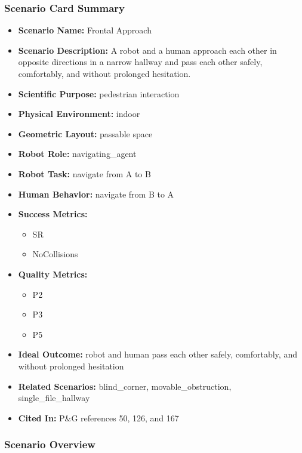 \documentclass[utf8]{frontiers_suppmat} %
\providecommand{\tightlist}{%
  \setlength{\itemsep}{0pt}\setlength{\parskip}{0pt}}
\begin{document}
\subsubsection{Scenario Card Summary}\label{scenario-card-summary}

\begin{itemize}
\tightlist
\item
  \textbf{Scenario Name:} Frontal Approach
\item
  \textbf{Scenario Description:} A robot and a human approach each other
  in opposite directions in a narrow hallway and pass each other safely,
  comfortably, and without prolonged hesitation.
\item
  \textbf{Scientific Purpose:} pedestrian interaction
\item
  \textbf{Physical Environment:} indoor
\item
  \textbf{Geometric Layout:} passable space
\item
  \textbf{Robot Role:} navigating\_agent
\item
  \textbf{Robot Task:} navigate from A to B
\item
  \textbf{Human Behavior:} navigate from B to A
\item
  \textbf{Success Metrics:}

  \begin{itemize}
  \tightlist
  \item
    SR
  \item
    NoCollisions
  \end{itemize}
\item
  \textbf{Quality Metrics:}

  \begin{itemize}
  \tightlist
  \item
    P2
  \item
    P3
  \item
    P5
  \end{itemize}
\item
  \textbf{Ideal Outcome:} robot and human pass each other safely,
  comfortably, and without prolonged hesitation
\item
  \textbf{Related Scenarios:} blind\_corner, movable\_obstruction,
  single\_file\_hallway
\item
  \textbf{Cited In:} P\&G references 50, 126, and 167
\end{itemize}

\subsubsection{Scenario Overview}\label{scenario-overview}
\end{document}
